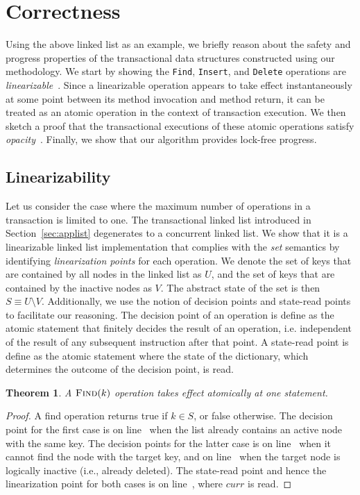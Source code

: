 \documentclass[10pt,conference,compsocconf]{IEEEtran}
\newtheorem{theorem}{Theorem}
\begin{document}
\section{Correctness}
\label{sec:correctness}
Using the above linked list as an example, we briefly reason about the safety and progress properties of the transactional data structures constructed using our methodology. 
We start by showing the \texttt{Find}, \texttt{Insert}, and \texttt{Delete} operations are \emph{linearizable}~\cite{herlihy2012art}.
Since a linearizable operation appears to take effect instantaneously at some point between its method invocation and method return, it can be treated as an atomic operation in the context of transaction execution.
We then sketch a proof that the transactional executions of these atomic operations satisfy \emph{opacity}~\cite{guerraoui2008correctness}.
Finally, we show that our algorithm provides lock-free progress. 

\subsection{Linearizability}
Let us consider the case where the maximum number of operations in a transaction is limited to one.
The transactional linked list introduced in Section~\ref{sec:applist} degenerates to a concurrent linked list.
We show that it is a linearizable linked list implementation that complies with the \emph{set} semantics by identifying \emph{linearization points} for each operation.
We denote the set of keys that are contained by all nodes in the linked list as $U$, and the set of keys that are contained by the inactive nodes as $V$.
The abstract state of the set is then $S \equiv U \setminus V$.
Additionally, we use the notion of decision points and state-read points to facilitate our reasoning. 
The decision point of an operation is define as the atomic statement that finitely decides the result of an operation, i.e. independent of the result of any subsequent instruction after that point.
A state-read point is define as the atomic statement where the state of the dictionary, which determines the outcome of the decision point, is read.

\begin{theorem}
    A $\textsc{Find}(k)$ operation takes effect atomically at one statement.
\end{theorem}
\begin{proof}
    A find operation returns true if $k \in S$, or false otherwise.  
    The decision point for the first case is on line~ when the list already contains an active node with the same key.
    The decision points for the latter case is on line~ when it cannot find the node with the target key, and on line~ when the target node is logically inactive (i.e., already deleted).
    The state-read point and hence the linearization point for both cases is on line~, where $curr$ is read.
\end{proof}
\end{document}

